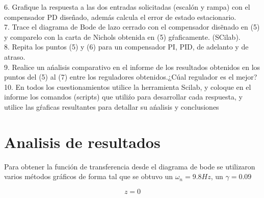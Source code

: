 \documentclass[12pt,letterpaper]{article}
\begin{document}
6. Grafique la respuesta a las dos entradas solicitadas (escalón y rampa) con el compensador PD diseñado, además calcula el error de estado estacionario.\\



7. Trace el diagrama de Bode de lazo cerrado con el compensador disẽnado en (5) y comparelo con la
carta de Nichols obtenida en (5) gŕaficamente. (SCilab).\\




8. Repita los puntos (5) y (6) para un compensador PI, PID, de adelanto y de atraso.\\


9. Realice un ańalisis comparativo en el informe de los resultados obtenidos en los puntos del (5) al (7)
entre los reguladores obtenidos.¿Cúal regulador es el mejor?\\




10. En todos los cuestionamientos utilice la herramienta Scilab, y coloque en el informe los comandos (scripts) que utiliźo para desarrollar cada respuesta, y utilice las gŕaficas resultantes para detallar su ańalisis y conclusiones\\

\section{Analisis de resultados}

Para obtener la función de transferencia desde el diagrama de bode se utilizaron varios métodos gráficos de forma tal que se obtuvo un $\omega_n=9.8Hz$, un $\gamma=0.09$

\begin{equation}
    z = 0
    \label{nombre}
\end{equation}


\nocite{*}


\end{document}
